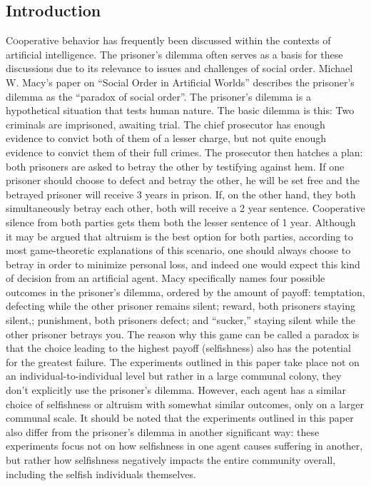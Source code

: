 \documentclass[twoside]{article}
\begin{document}
\begin{multicols}{2} %

\section{Introduction}

	\lettrine[nindent=0em,lines=2]{C} ooperative behavior has frequently been discussed within the contexts of artificial intelligence. The prisoner's dilemma often serves as a basis for these discussions due to its relevance to issues and challenges of social order. Michael W. Macy's paper on ``Social Order in Artificial Worlds'' describes the prisoner's dilemma as the ``paradox of social order''. \cite{macy} The prisoner's dilemma is a hypothetical situation that tests human nature. The basic dilemma is this: Two criminals are imprisoned, awaiting trial. The chief prosecutor has enough evidence to convict both of them of a lesser charge, but not quite enough evidence to convict them of their full crimes. The prosecutor then hatches a plan: both prisoners are asked to betray the other by testifying against hem. If one prisoner should choose to defect and betray the other, he will be set free and the betrayed prisoner will receive 3 years in prison. If, on the other hand, they both simultaneously betray each other, both will receive a 2 year sentence. Cooperative silence from both parties gets them both the lesser sentence of 1 year. Although it may be argued that altruism is the best option for both parties, according to most game-theoretic explanations of this scenario, one should always choose to betray in order to minimize personal loss, and indeed one would expect this kind of decision from an artificial agent. Macy specifically names four possible outcomes in the prisoner's dilemma, ordered by the amount of payoff: temptation, defecting while the other prisoner remains silent; reward, both prisoners staying silent,; punishment, both prisoners defect; and ``sucker,'' staying silent while the other prisoner betrays you. The reason why this game can be called a paradox is that the choice leading to the highest payoff (selfishness) also has the potential for the greatest failure. The experiments outlined in this paper take place not on an individual-to-individual level but rather in a large communal colony, they don't explicitly use the prisoner's dilemma. However, each agent has a similar choice of selfishness or altruism with somewhat similar outcomes, only on a larger communal scale. It should be noted that the experiments outlined in this paper also differ from the prisoner's dilemma in another significant way: these experiments focus not on how selfishness in one agent causes suffering in another, but rather how selfishness negatively impacts the entire community overall, including the selfish individuals themselves.



\end{multicols}
\end{document}
